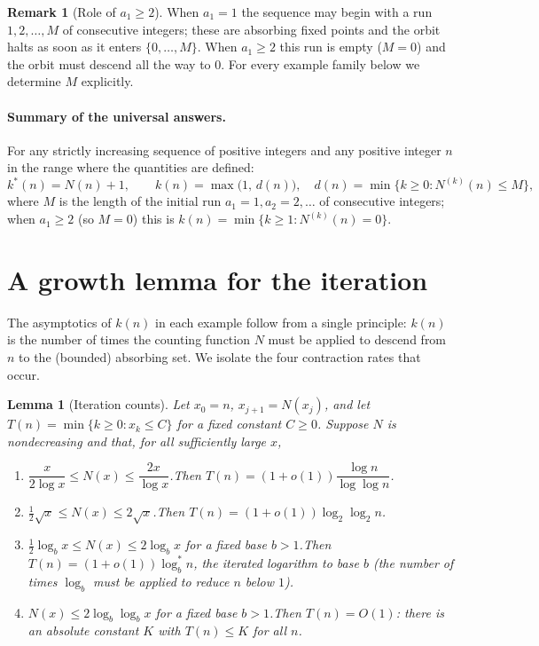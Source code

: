 \documentclass[12pt]{article}
\newtheorem{lemma}{Lemma}
\theoremstyle{definition}
\newtheorem{remark}{Remark}
\begin{document}
\begin{remark}[Role of $a_1\ge 2$]
When $a_1=1$ the sequence may begin with a run $1,2,\dots,M$ of consecutive integers;
these are absorbing fixed points and the orbit halts as soon as it enters
$\{0,\dots,M\}$. When $a_1\ge2$ this run is empty ($M=0$) and the orbit must descend
all the way to $0$. For every example family below we determine $M$ explicitly.
\end{remark}

\paragraph{Summary of the universal answers.}
For any strictly increasing sequence of positive integers and any positive integer
$n$ in the range where the quantities are defined:
\[
  k^*(n)=N(n)+1,\qquad
  k(n)=\max\bigl(1,\,d(n)\bigr),\quad
  d(n)=\min\{k\ge0:N^{(k)}(n)\le M\},
\]
where $M$ is the length of the initial run $a_1=1,a_2=2,\dots$ of consecutive
integers; when $a_1\ge2$ (so $M=0$) this is $k(n)=\min\{k\ge1:N^{(k)}(n)=0\}$.

\section{A growth lemma for the iteration}

The asymptotics of $k(n)$ in each example follow from a single principle: $k(n)$ is
the number of times the counting function $N$ must be applied to descend from $n$ to
the (bounded) absorbing set. We isolate the four contraction rates that occur.

\begin{lemma}[Iteration counts]\label{lem:rates}
Let $x_0=n$, $x_{j+1}=N(x_j)$, and let $T(n)=\min\{k\ge0:x_k\le C\}$ for a fixed
constant $C\ge0$. Suppose $N$ is nondecreasing and that, for all sufficiently large
$x$,
\begin{enumerate}
\item[(P)] $\dfrac{x}{2\log x}\le N(x)\le\dfrac{2x}{\log x}$.\quad Then
$T(n)=(1+o(1))\dfrac{\log n}{\log\log n}$.
\item[(S)] $\tfrac12\sqrt x\le N(x)\le 2\sqrt x$.\quad Then
$T(n)=(1+o(1))\log_2\log_2 n$.
\item[(L)] $\tfrac12\log_b x\le N(x)\le 2\log_b x$ for a fixed base $b>1$.\quad Then
$T(n)=(1+o(1))\log^*_b n$, the iterated logarithm to base $b$ (the number of times
$\log_b$ must be applied to reduce $n$ below $1$).
\item[(D)] $N(x)\le 2\log_b\log_b x$ for a fixed base $b>1$.\quad Then $T(n)=O(1)$:
there is an absolute constant $K$ with $T(n)\le K$ for all $n$.
\end{enumerate}
\end{lemma}
\end{document}
